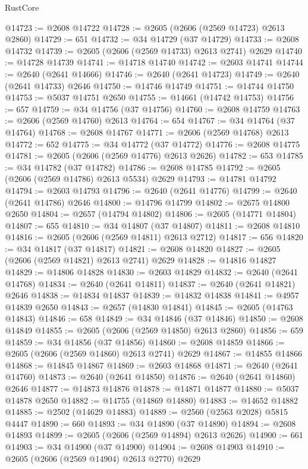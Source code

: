 \begin{lexlean}{RustCore}
\begin{coremodule}
@14723 := @2608 @14722
@14728 := @2605 (@2606 (@2569 @14723) @2613 @2860)
@14729 := 651
@14732 := @34 @14729 (@37 @14729)
@14733 := @2608 @14732
@14739 := @2605 (@2606 (@2569 @14733) @2613 @2741) @2629
@14740 := @14728 @14739
@14741 := @14718 @14740
@14742 := @2603 @14741
@14744 := @2640 (@2641 @14666)
@14746 := @2640 (@2641 @14723)
@14749 := @2640 (@2641 @14733) @2646
@14750 := @14746 @14749
@14751 := @14744 @14750
@14753 := @5037 @14751 @2650
@14755 := @14661 (@14742 @14753)
@14756 := 657
@14759 := @34 @14756 (@37 @14756)
@14760 := @2608 @14759
@14763 := @2606 (@2569 @14760) @2613
@14764 := 654
@14767 := @34 @14764 (@37 @14764)
@14768 := @2608 @14767
@14771 := @2606 (@2569 @14768) @2613
@14772 := 652
@14775 := @34 @14772 (@37 @14772)
@14776 := @2608 @14775
@14781 := @2605 (@2606 (@2569 @14776) @2613 @2626)
@14782 := 653
@14785 := @34 @14782 (@37 @14782)
@14786 := @2608 @14785
@14792 := @2605 (@2606 (@2569 @14786) @2613 @5534) @2629
@14793 := @14781 @14792
@14794 := @2603 @14793
@14796 := @2640 (@2641 @14776)
@14799 := @2640 (@2641 @14786) @2646
@14800 := @14796 @14799
@14802 := @2675 @14800 @2650
@14804 := @2657 (@14794 @14802)
@14806 := @2605 (@14771 @14804)
@14807 := 655
@14810 := @34 @14807 (@37 @14807)
@14811 := @2608 @14810
@14816 := @2605 (@2606 (@2569 @14811) @2613 @2712)
@14817 := 656
@14820 := @34 @14817 (@37 @14817)
@14821 := @2608 @14820
@14827 := @2605 (@2606 (@2569 @14821) @2613 @2741) @2629
@14828 := @14816 @14827
@14829 := @14806 @14828
@14830 := @2603 @14829
@14832 := @2640 (@2641 @14768)
@14834 := @2640 (@2641 @14811)
@14837 := @2640 (@2641 @14821) @2646
@14838 := @14834 @14837
@14839 := @14832 @14838
@14841 := @4957 @14839 @2650
@14843 := @2657 (@14830 @14841)
@14845 := @2605 (@14763 @14843)
@14846 := 658
@14849 := @34 @14846 (@37 @14846)
@14850 := @2608 @14849
@14855 := @2605 (@2606 (@2569 @14850) @2613 @2860)
@14856 := 659
@14859 := @34 @14856 (@37 @14856)
@14860 := @2608 @14859
@14866 := @2605 (@2606 (@2569 @14860) @2613 @2741) @2629
@14867 := @14855 @14866
@14868 := @14845 @14867
@14869 := @2603 @14868
@14871 := @2640 (@2641 @14760)
@14873 := @2640 (@2641 @14850)
@14876 := @2640 (@2641 @14860) @2646
@14877 := @14873 @14876
@14878 := @14871 @14877
@14880 := @5037 @14878 @2650
@14882 := @14755 (@14869 @14880)
@14883 := @14652 @14882
@14885 := @2502 (@14629 @14883)
@14889 := @2560 (@2563 @2028) @5815 @4447
@14890 := 660
@14893 := @34 @14890 (@37 @14890)
@14894 := @2608 @14893
@14899 := @2605 (@2606 (@2569 @14894) @2613 @2626)
@14900 := 661
@14903 := @34 @14900 (@37 @14900)
@14904 := @2608 @14903
@14910 := @2605 (@2606 (@2569 @14904) @2613 @2770) @2629

\end{coremodule}
\end{lexlean}
